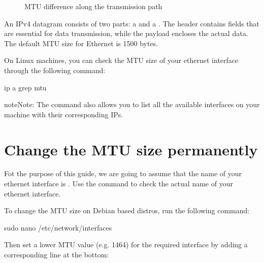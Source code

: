 \documentclass[a4paper,10pt,english,openany,oneside]{sphinxmanual}
\begin{document}
\begin{figure}[H]
\centering
\capstart

\noindent{}
\caption{MTU difference along the transmission path}\label{\detokenize{mtu-connectivity:id4}}\end{figure}

\sphinxAtStartPar
An IPv4 datagram consists of two parts: a  and a . The header contains fields that are essential for data transmission, while the payload encloses the actual data. The default MTU size for Ethernet is 1500 bytes.

\sphinxAtStartPar
On Linux machines, you can check the MTU size of your ethernet interface through the following command:

\begin{sphinxVerbatim}[commandchars=\\\{\}]
ip a  grep mtu
\end{sphinxVerbatim}

\begin{sphinxadmonition}{note}{Note:}
\sphinxAtStartPar
The  command also allows you to list all the available interfaces on your machine with their corresponding IPs.
\end{sphinxadmonition}


\chapter{Change the MTU size permanently}
\label{\detokenize{mtu-connectivity:change-the-mtu-size-permanently}}
\sphinxAtStartPar
Fot the purpose of this guide, we are going to assume that the name of your ethernet interface is . Use the  command to check the actual name of your ethernet interface.

\sphinxAtStartPar
To change the MTU size on Debian based distros, run the following command:

\begin{sphinxVerbatim}[commandchars=\\\{\}]
sudo nano /etc/network/interfaces
\end{sphinxVerbatim}

\sphinxAtStartPar
Then set a lower MTU value (e.g. 1464) for the required interface by adding a corresponding line at the bottom:
\end{document}
